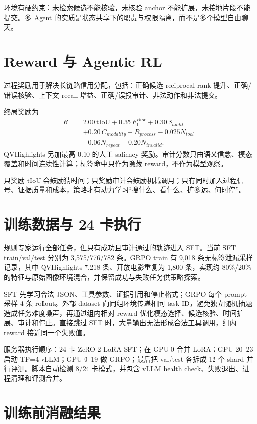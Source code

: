 \documentclass[UTF8,letterpaper,10pt,twocolumn]{ctexart}
\begin{document}
环境有硬约束：未检索候选不能核验，未核验 anchor 不能扩展，未接地片段不能提交。多 Agent 的实质是状态共享下的职责与权限隔离，而不是多个模型自由聊天。

\section{Reward 与 Agentic RL}

过程奖励用于解决长链路信用分配，包括：正确候选 reciprocal-rank 提升、正确/错误核验、上下文 recall 增益、正确/误报审计、非法动作和非法提交。

终局奖励为
\begin{align}
R={}&2.00\,\mathrm{tIoU}+0.35\,F_1^{shot}
 +0.30\,S_{audit}\nonumber\\
 &+0.20\,C_{modality}+R_{process}
 -0.025N_{tool}\nonumber\\
 &-0.06N_{repeat}-0.20N_{invalid}.
\end{align}
QVHighlights 另加最高 0.10 的人工 saliency 奖励。审计分数只由语义信念、模态覆盖和时间连续性计算；标签命中只作为隐藏 reward，不作为模型观察。

只奖励 tIoU 会鼓励猜时间；只奖励审计会鼓励机械调用；只有同时加入过程信号、证据质量和成本，策略才有动力学习“搜什么、看什么、扩多远、何时停”。

\section{训练数据与 24 卡执行}

规则专家运行全部任务，但只有成功且审计通过的轨迹进入 SFT。当前 SFT train/val/test 分别为 3,575/776/782 条。GRPO train 有 9,018 条无标签泄漏采样记录，其中 QVHighlights 7,218 条、开放电影重复为 1,800 条，实现约 80\%/20\% 的特征与原始图像环境混合，并保留成功与失败任务供策略探索。

SFT 先学习合法 JSON、工具参数、证据引用和停止格式；GRPO 每个 prompt 采样 4 条 rollout。外部 dataset 向同组环境传递相同 task ID，避免独立随机抽题造成任务难度噪声，再通过组内相对 reward 优化模态选择、候选核验、时间扩展、审计和停止。直接跳过 SFT 时，大量输出无法形成合法工具调用，组内 reward 接近同一个失败值。

服务器执行顺序：24 卡 ZeRO-2 LoRA SFT；在 GPU 0 合并 LoRA；GPU 20--23 启动 TP=4 vLLM；GPU 0--19 做 GRPO；最后把 val/test 各拆成 12 个 shard 并行评测。脚本自动检测 8/24 卡模式，并包含 vLLM health check、失败退出、进程清理和评测合并。

\section{训练前消融结果}
\end{document}
